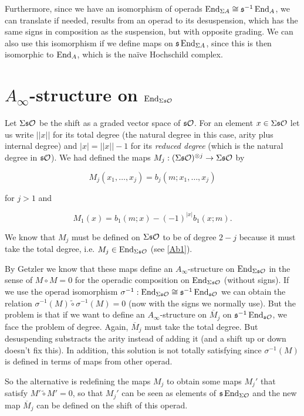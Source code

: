 \documentclass[twoside]{article}
\begin{document}
Furthermore, since we have an isomorphism of operads $\operatorname{End}_{\Sigma A}\cong \mathfrak{s}^{-1}\operatorname{End}_A$, we can translate if needed, results from an operad to its desuspension, which has the same signs in composition as the suspension, but with opposite grading. We can also use this isomorphism if we define maps on $\mathfrak{s}\operatorname{End}_{\Sigma A}$, since this is then isomorphic to $\operatorname{End}_A$, which is the naïve Hochschild complex.

\section{$A_\infty$-structure on $\operatorname{End}_{\Sigma\mathfrak{s}{\mathcal O}}$}

Let $\Sigma\mathfrak{s}{\mathcal O}$ be the shift as a graded vector space of $\mathfrak{s}{\mathcal O}$. For an element $x\in\Sigma\mathfrak{s}{\mathcal O}$ let us write $||x||$ for its total degree (the natural degree in this case, arity plus internal degree) and $|x|=||x||-1$ for its \emph{reduced degree} (which is the natural degree in $\mathfrak{s}{\mathcal O}$). We had defined the maps $M_j:(\Sigma\mathfrak{s}{\mathcal O})^{\otimes j}\to\Sigma\mathfrak{s}{\mathcal O}$ by 

$$M_j(x_1,\dots,x_j)=b_j(m;x_1,\dots, x_j)$$

for $j>1$ and

$$M_1(x)=b_1(m;x)-(-1)^{|x|}b_1(x;m).$$

We know that $M_j$ must be defined on $\Sigma\mathfrak{s}{\mathcal O}$ to be of degree $2-j$ because it must take the total degree, i.e. $M_j\in\operatorname{End}_{\Sigma\mathfrak{s}{\mathcal O}}$ (see \ref{Ab1}). 

By Getzler we know that these maps define an $A_\infty$-structure on $\operatorname{End}_{\Sigma\mathfrak{s}{\mathcal O}}$ in the sense of $M\circ M=0$ for the operadic composition on $\operatorname{End}_{\Sigma\mathfrak{s}{\mathcal O}}$ (without signs). If we use the operad isomorphism $\sigma^{-1}:\operatorname{End}_{\Sigma\mathfrak{s}{\mathcal O}}\cong\mathfrak{s}^{-1}\operatorname{End}_{\mathfrak{s}{\mathcal O}}$ we can obtain the relation $\sigma^{-1}(M)\tilde{\circ}\sigma^{-1}(M)=0$ (now with the signs we normally use). But the problem is that if we want to define an $A_\infty$-structure on $\overline{M}_j$ on $\mathfrak{s}^{-1}\operatorname{End}_{\mathfrak{s}{\mathcal O}}$, we face the problem of degree. Again, $\overline{M}_j$ must take the total degree. But desuspending substracts the arity instead of adding it (and a shift up or down doesn't fix this). In addition, this solution is not totally satisfying since $\sigma^{-1}(M)$ is defined in terms of maps from other operad. 


So the alternative is redefining the maps $M_j$ to obtain some maps $M_j'$ that satisfy $M'\tilde{\circ}M'=0$, so that $M_j'$ can be seen as elements of $\mathfrak{s}\operatorname{End}_{\Sigma{\mathcal O}}$ and the new map $\overline{M}_j$ can be defined on the shift of this operad.
\end{document}
